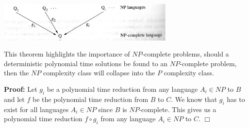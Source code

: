 \documentclass[a4paper,blends,pdf,colorBG,slideColor]{prosper}
\begin{document}
\vspace{.5in}

\begin{center}
\includegraphics[height=20mm]{images/np-complete.eps}
\end{center}
\es


This theorem highlights the importance of $NP$-complete problems, should a deterministic polynomial time solutions be found to an $NP$-complete problem, then
the $NP$ complexity class will collapse into the $P$ complexity class.

\es


{\bf Proof:} Let $g_i$ be a polynomial time reduction from any language $A_i \in NP$ to $B$ and let $f$ be the polynomial time reduction from $B$ to $C$.  We know that $g_i$ has to exist for all languages $A_i \in NP$ since $B$ is $NP$-complete.  This gives us a polynomial time reduction $f \circ g_i$ from any language $A_i \in NP$ to $C$. $\Box$
\es
\end{document}
